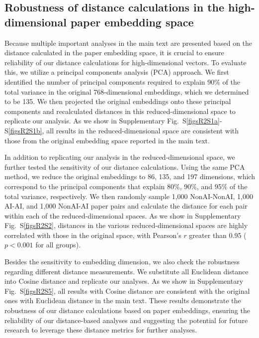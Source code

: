 \subsection{Robustness of distance calculations in the high-dimensional paper embedding space}
Because multiple important analyses in the main text are presented based on the distance calculated in the paper embedding space, it is crucial to ensure reliability of our distance calculations for high-dimensional vectors.
To evaluate this, we utilize a principal components analysis (PCA) approach. We first identified the number of principal components required to explain 90\% of the total variance in the original 768-dimensional embeddings, which we determined to be 135.
We then projected the original embeddings onto these principal components and recalculated distances in this reduced-dimensional space to replicate our analysis. 
As we show in Supplementary Fig.~S\ref{figsR2S1a}-S\ref{figsR2S1b}, all results in the reduced-dimensional space are consistent with those from the original embedding space reported in the main text.

In addition to replicating our analysis in the reduced-dimensional space, we further tested the sensitivity of our distance calculations.
Using the same PCA method, we reduce the original embeddings to 86, 135, and 197 dimensions, which correspond to the principal components that explain 80\%, 90\%, and 95\% of the total variance, respectively.
We then randomly sample 1,000 NonAI-NonAI, 1,000 AI-AI, and 1,000 NonAI-AI paper pairs and calculate the distance for each pair within each of the reduced-dimensional spaces.
As we show in Supplementary Fig.~S\ref{figsR2S2}, distances in the various reduced-dimensional spaces are highly correlated with those in the original space, with Pearson’s $r$ greater than 0.95 ($p<0.001$ for all groups).

Besides the sensitivity to embedding dimension, we also check the robustness regarding different distance measurements.
We substitute all Euclidean distance into Cosine distance and replicate our analyses.
As we show in Supplementary Fig.~S\ref{figsR2S5}, all results with Cosine distance are consistent with the original ones with Euclidean distance in the main text.
These results demonstrate the robustness of our distance calculations based on paper embeddings, ensuring the reliability of our distance-based analyses and suggesting the potential for future research to leverage these distance metrics for further analyses.